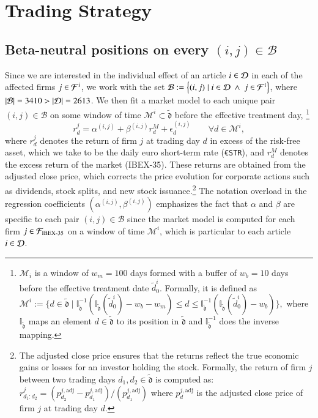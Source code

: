 \section{Trading Strategy}

\subsection{Beta-neutral positions on every $(i,j)\in\mathcal B$}
Since we are interested in the individual effect of an article $i\in\mathcal{D}$ in each of the affected firms $j\in\mathcal{F}^i$, we work with the set
$
\mathcal{B}:=\left\{(i,j) \mid i\in \mathcal{D} ~\wedge~j\in \mathcal{F}^i \right\}
$, where $\left|\mathcal{B}\right|=3410>\left|\mathcal{D}\right|=2613$. 
We then fit a market model to each unique pair $(i,j)\in \mathcal{B}$
on some window of time $\mathcal{M}^i\subset \tilde{\mathfrak{d}}$ before the effective treatment day,%
\footnote{$\mathcal M_i$ is a window of $w_m=100$ days formed with a buffer of $w_b=10$ days  before the effective treatment date $\tilde d_0^i$. Formally, it is defined as   
$
\mathcal{M}^i := 
\{
d\in \tilde{\mathfrak{d}}
\mid 
\mathbb{I}^{-1}_{\tilde{\mathfrak{d}}} 
(
\mathbb{I}_{\tilde{\mathfrak{d}}} (\tilde{d}_0^i) - {w}_b - {w}_m 
)
\leq d \leq 
\mathbb{I}^{-1}_{\tilde{\mathfrak{d}}} 
(
\mathbb{I}_{\tilde{\mathfrak{d}}} (\tilde{d}_0^i) - {w}_b 
)
\}
,
$
where $\mathbb{I}_{\tilde{\mathfrak d}}$ maps an element $d\in\tilde{\mathfrak d}$ to its position in $\tilde{\mathfrak d}$ and $\mathbb{I}^{-1}_{\tilde{\mathfrak d}}$ does the inverse mapping. 
}
%
%
$$
r_{d}^{j} = \alpha^{(i,j)} + \beta^{(i,j)} r_{d}^M + \epsilon_{ d}^{(i,j)} 
\qquad  
\forall d \in \mathcal{M}^i
,
$$
where 
$r_{d}^{j}$ denotes the return of firm $j$ at trading day $d$ in excess of the risk-free asset, which we take to be the daily euro short-term rate (\texttt{\euro STR}),
and 
$r_{d}^M$ denotes the excess return of the market (IBEX-35).  
These returns are obtained from the adjusted close price, which corrects the price evolution for corporate actions such as dividends, stock splits, and new stock issuance.\footnote{
The adjusted close price ensures that the returns reflect the true economic gains or losses for an investor holding the stock. 
%
Formally, the return of firm $j$ between two trading days $d_1, d_2\in \tilde{\mathfrak{d}}$ is computed as:
$
r_{d_1:d_2}^{j} = 
(
p_{d_2}^{j,\text{adj}} - p_{d_1}^{j,\text{adj}}
)/(
p_{d_1}^{j,\text{adj}}
)
$
where $p_{d}^{j,\text{adj}}$ is the adjusted close price of firm $j$ at trading day $d$.
}
%
The notation overload in the regression coefficients $(\alpha^{(i,j)},\beta^{(i,j)})$ emphasizes the fact that $\alpha$ and $\beta$ are specific to each pair $(i,j)\in\mathcal B$ since the market model is computed for each firm $j\in\mathcal{F}_{\text{IBEX-35}}$ on a window of time $\mathcal{M}^i$, which is particular to each article $i\in\mathcal{D}$.


